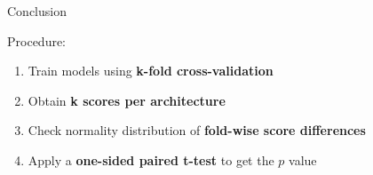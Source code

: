 \documentclass{beamer} %
\begin{document}
\begin{frame}{Conclusion}

Procedure:

\begin{enumerate}
\item Train models using \textbf{k-fold cross-validation}
\item Obtain \textbf{k scores per architecture}
\item Check normality distribution of \textbf{fold-wise score differences}
\item Apply a \textbf{one-sided paired t-test} to get the $p$ value
\end{enumerate}

\bigskip

\begin{algorithm}[H]
\end{algorithm}

\end{frame}
\end{document}
